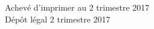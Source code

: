 \cleardoublepage
\mbox{}
\vfill

{\scriptsize
\begin{center}
Achevé d'imprimer au 2 trimestre 2017 \\
Dépôt légal\frcolon{} 2 trimestre 2017
\end{center}
}
\enlargethispage{\footskip}


